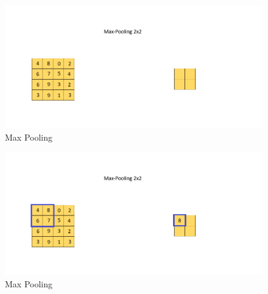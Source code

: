 \documentclass[a4paper,12pt]{report}
\begin{document}
\begin{figure}[htbp]
  \centering
  \includegraphics[width=\textwidth]{images/CNN_Max_Pooling_0.png}
  \caption{Max Pooling}
  \label{fig:fullwidth}
\end{figure}
	
\begin{figure}[htbp]
  \centering
  \includegraphics[width=\textwidth]{images/CNN_Max_Pooling_1.png}
  \caption{Max Pooling}
  \label{fig:fullwidth}
\end{figure}
\end{document}
